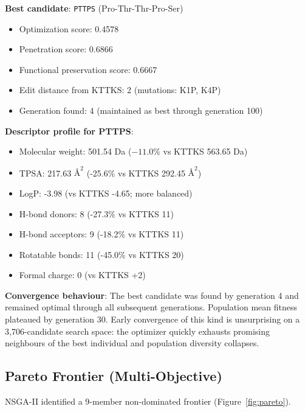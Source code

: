 \documentclass[11pt,letterpaper]{article}
\begin{document}
\textbf{Best candidate}: \texttt{PTTPS} (Pro-Thr-Thr-Pro-Ser)
\begin{itemize}
  \item Optimization score: 0.4578
  \item Penetration score: 0.6866
  \item Functional preservation score: 0.6667
  \item Edit distance from KTTKS: 2 (mutations: K1P, K4P)
  \item Generation found: 4 (maintained as best through generation 100)
\end{itemize}

\textbf{Descriptor profile for PTTPS}:
\begin{itemize}
  \item Molecular weight: 501.54 Da ($-11.0\%$ vs KTTKS 563.65 Da)
  \item TPSA: 217.63 $\text{\AA}^2$ (-25.6\% vs KTTKS 292.45 $\text{\AA}^2$)
  \item LogP: -3.98 (vs KTTKS -4.65; more balanced)
  \item H-bond donors: 8 (-27.3\% vs KTTKS 11)
  \item H-bond acceptors: 9 (-18.2\% vs KTTKS 11)
  \item Rotatable bonds: 11 (-45.0\% vs KTTKS 20)
  \item Formal charge: 0 (vs KTTKS +2)
\end{itemize}

\textbf{Convergence behaviour}: The best candidate was found by generation 4 and remained optimal through all subsequent generations. Population mean fitness plateaued by generation 30. Early convergence of this kind is unsurprising on a 3,706-candidate search space: the optimizer quickly exhausts promising neighbours of the best individual and population diversity collapses.

\subsection{Pareto Frontier (Multi-Objective)}

NSGA-II identified a 9-member non-dominated frontier (Figure~\ref{fig:pareto}).
\end{document}
